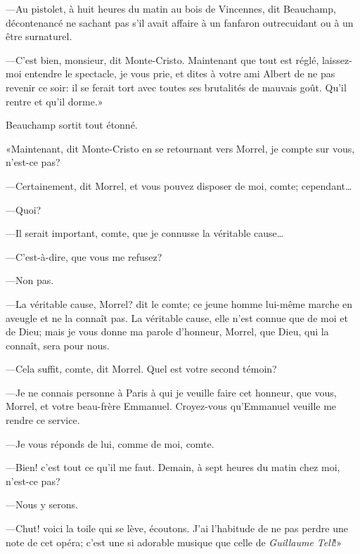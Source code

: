 —Au pistolet, à huit heures du matin au bois de Vincennes, dit Beauchamp, décontenancé ne sachant pas s'il avait affaire à un fanfaron outrecuidant ou à un être surnaturel. 

—C'est bien, monsieur, dit Monte-Cristo. Maintenant que tout est réglé, laissez-moi entendre le spectacle, je vous prie, et dites à votre ami Albert de ne pas revenir ce soir: il se ferait tort avec toutes ses brutalités de mauvais goût. Qu'il rentre et qu'il dorme.» 

Beauchamp sortit tout étonné. 

«Maintenant, dit Monte-Cristo en se retournant vers Morrel, je compte sur vous, n'est-ce pas? 

—Certainement, dit Morrel, et vous pouvez disposer de moi, comte; cependant\dots 

—Quoi? 

—Il serait important, comte, que je connusse la véritable cause\dots 

—C'est-à-dire, que vous me refusez? 

—Non pas. 

—La véritable cause, Morrel? dit le comte; ce jeune homme lui-même marche en aveugle et ne la connaît pas. La véritable cause, elle n'est connue que de moi et de Dieu; mais je vous donne ma parole d'honneur, Morrel, que Dieu, qui la connaît, sera pour nous. 

—Cela suffit, comte, dit Morrel. Quel est votre second témoin? 

—Je ne connais personne à Paris à qui je veuille faire cet honneur, que vous, Morrel, et votre beau-frère Emmanuel. Croyez-vous qu'Emmanuel veuille me rendre ce service. 

—Je vous réponds de lui, comme de moi, comte. 

—Bien! c'est tout ce qu'il me faut. Demain, à sept heures du matin chez moi, n'est-ce pas? 

—Nous y serons. 

—Chut! voici la toile qui se lève, écoutons. J'ai l'habitude de ne pas perdre une note de cet opéra; c'est une si adorable musique que celle de \textit{Guillaume Tell}!» 